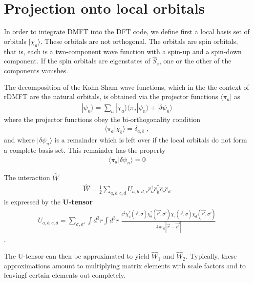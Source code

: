 \documentclass[11pt,a4paper]{report}
\begin{document}
\section{Projection onto local orbitals}
In order to integrate DMFT into the DFT code, we define first a local
basis set of orbitals $|\chi_a\rangle$. These orbitals are not
orthogonal. The orbitals are spin orbitals, that is, each is a
two-component wave function with a spin-up and a spin-down
component. If the spin orbitals are eigenstates of $\hat{S}_z$, one or
the other of the components vanishes.

The decomposition of the Kohn-Sham wave functions,
which in the the context of rDMFT are the natural orbitals, is
obtained via the projector functions $\langle\pi_a|$ as
\begin{eqnarray}
|\psi_n\rangle=\sum_a|\chi_a\rangle\langle\pi_a|\psi_n\rangle
+|\delta\psi_n\rangle
\end{eqnarray}
where the projector functions obey the bi-orthogonality condition
\begin{eqnarray}
\langle\pi_a|\chi_b\rangle=\delta_{a,b}\;,
\end{eqnarray}
and where $|\delta\psi_n\rangle$ is a remainder which is left over if the
local orbitals do not form a complete basis set. This remainder has
the property
\begin{eqnarray}
\langle\pi_a|\delta\psi_n\rangle=0
\end{eqnarray}

The interaction $\hat{W}$  
\begin{eqnarray}
\hat{W}
=\frac{1}{2}\sum_{a,b,c,d} U_{a,b,d,c}\hat{c}^\dagger_a\hat{c}^\dagger_b\hat{c}_c\hat{c}_d
\end{eqnarray}
is expressed by the \textbf{U-tensor}
\begin{eqnarray}
U_{a,b,c,d}=\sum_{\sigma,\sigma'}\int d^3r\int d^3r\;
\frac{e^2\chi^*_a(\vec{r},\sigma)\chi^*_b(\vec{r'},\sigma')
\chi_c(\vec{r},\sigma)\chi_d(\vec{r'},\sigma')}
{4\pi\epsilon_0|\vec{r}-\vec{r'}|}
\end{eqnarray}.

The U-tensor can then be approximated to yield $\hat{W}_1$ and
$\hat{W}_2$. Typically, these approximations amount to multiplying
matrix elements with scale factors and to leavingf certain elements
out completely.

\end{document}
